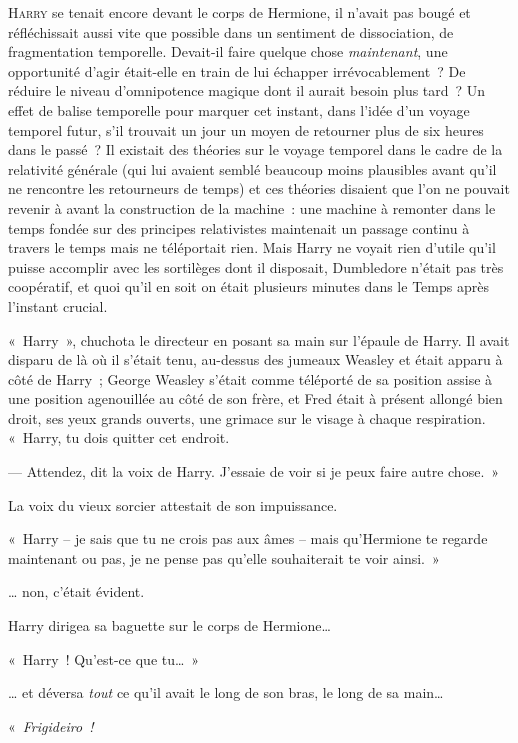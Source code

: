 
\lettrine{H}{arry} se tenait encore devant le corps de Hermione, il n'avait pas bougé et réfléchissait aussi vite que possible dans un sentiment de dissociation, de fragmentation temporelle.
Devait-il faire quelque chose \emph{maintenant}, une opportunité d'agir était-elle en train de lui échapper irrévocablement~?
De réduire le niveau d'omnipotence magique dont il aurait besoin plus tard~?
Un effet de balise temporelle pour marquer cet instant, dans l'idée d'un voyage temporel futur, s'il trouvait un jour un moyen de retourner plus de six heures dans le passé~?
Il existait des théories sur le voyage temporel dans le cadre de la relativité générale (qui lui avaient semblé beaucoup moins plausibles avant qu'il ne rencontre les retourneurs de temps) et ces théories disaient que l'on ne pouvait revenir à avant la construction de la machine~: une machine à remonter dans le temps fondée sur des principes relativistes maintenait un passage continu à travers le temps mais ne téléportait rien.
Mais Harry ne voyait rien d'utile qu'il puisse accomplir avec les sortilèges dont il disposait, Dumbledore n'était pas très coopératif, et quoi qu'il en soit on était plusieurs minutes dans le Temps après l'instant crucial.

«~Harry~», chuchota le directeur en posant sa main sur l'épaule de Harry.
Il avait disparu de là où il s'était tenu, au-dessus des jumeaux Weasley et était apparu à côté de Harry~; George Weasley s'était comme téléporté de sa position assise à une position agenouillée au côté de son frère, et Fred était à présent allongé bien droit, ses yeux grands ouverts, une grimace sur le visage à chaque respiration.
«~Harry, tu dois quitter cet endroit.

--- Attendez, dit la voix de Harry.
J'essaie de voir si je peux faire autre chose.~»

La voix du vieux sorcier attestait de son impuissance.

«~Harry -- je sais que tu ne crois pas aux âmes -- mais qu'Hermione te regarde maintenant ou pas, je ne pense pas qu'elle souhaiterait te voir ainsi.~»

… non, c'était évident.

Harry dirigea sa baguette sur le corps de Hermione…

«~Harry~!
Qu'est-ce que tu…~»

… et déversa \emph{tout} ce qu'il avait le long de son bras, le long de sa main…

«~\emph{Frigideiro~!}

